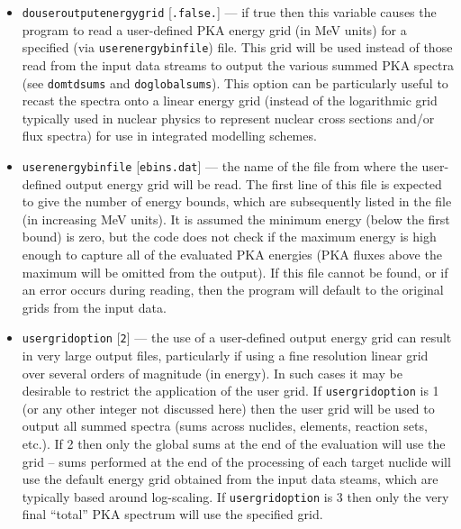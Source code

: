 \documentclass[a4paper]{article}
\begin{document}
\begin{itemize}

\item \texttt{do{\textunderscore}user{\textunderscore}output{\textunderscore}energy{\textunderscore}grid} [\texttt{.false.}] --- if true then this variable causes the program to read a user-defined PKA energy grid (in MeV units) for a specified (via \texttt{user{\textunderscore}energybin{\textunderscore}file}) file. This grid will be used instead of those read from the input data streams to output the various summed PKA spectra (see \texttt{do{\textunderscore}mtd{\textunderscore}sums} and \texttt{do{\textunderscore}global{\textunderscore}sums}). This option can be particularly useful to recast the spectra onto a linear energy grid (instead of the logarithmic grid typically used in nuclear physics to represent nuclear cross sections and/or flux spectra) for use in integrated modelling schemes.

\item \texttt{user{\textunderscore}energybin{\textunderscore}file} [\texttt{ebins.dat}] --- the name of the file from where the user-defined output energy grid will be read. The first line of this file is expected to give the number of energy bounds, which are subsequently listed in the file (in increasing MeV units). It is assumed the minimum energy (below the first bound) is zero, but the code does not check if the maximum energy is high enough to capture all of the evaluated PKA energies (PKA fluxes above the maximum will be omitted from the output). If this file cannot be found, or if an error occurs during reading, then the program will default to the original grids from the input data.

\item \texttt{user{\textunderscore}grid{\textunderscore}option} [\texttt{2}] --- the use of a user-defined output energy grid can result in very large output files, particularly if using a fine resolution linear grid over several orders of magnitude (in energy). In such cases it may be desirable to restrict the application of the user grid. If \texttt{user{\textunderscore}grid{\textunderscore}option} is 1 (or any other integer not discussed here) then the user grid will be used to output all summed spectra (sums across nuclides, elements, reaction sets, etc.). If 2 then only the global sums at the end of the evaluation will use the grid -- sums performed at the end of the processing of each target nuclide will use the default energy grid obtained from the input data steams, which are typically based around log-scaling. If \texttt{user{\textunderscore}grid{\textunderscore}option} is 3 then only the very final ``total'' PKA spectrum will use the specified grid.


\end{itemize}
\end{document}
